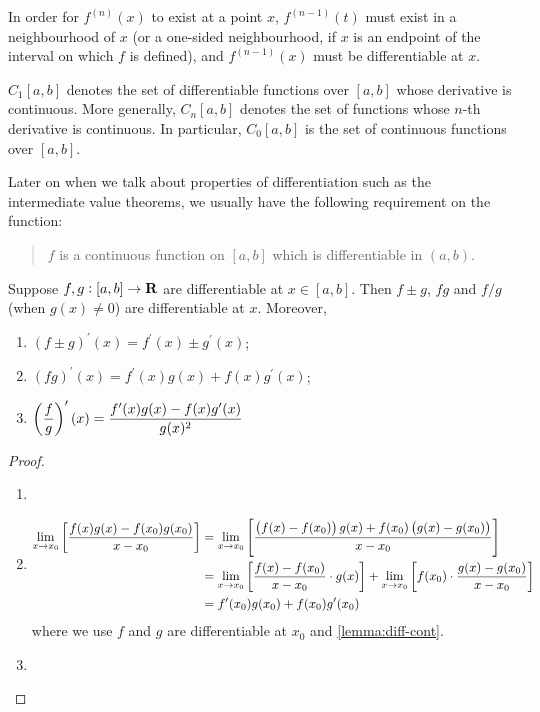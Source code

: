 \begin{remark}
In order for $f^{(n)}(x)$ to exist at a point $x$, $f^{(n-1)}(t)$ must exist in a neighbourhood of $x$ (or a one-sided neighbourhood, if $x$ is an endpoint of the interval on which $f$ is defined), and $f^{(n-1)}(x)$ must be differentiable at $x$.
\end{remark}

\begin{notation}
$C_1[a,b]$ denotes the set of differentiable functions over $[a,b]$ whose derivative is continuous. More generally, $C_n[a,b]$ denotes the set of functions whose $n$-th derivative is continuous. In particular, $C_0[a,b]$ is the set of continuous functions over $[a,b]$.
\end{notation}

Later on when we talk about properties of differentiation such as the intermediate value theorems, we usually have the following requirement on the function:
\begin{quote}
$f$ is a continuous function on $[a,b]$ which is differentiable in $(a,b)$.
\end{quote}

\begin{lemma}
Suppose $f,g:[a,b]\to\mathbf R$ are differentiable at $x\in[a,b]$. Then $f\pm g$, $fg$ and $f/g$ (when $g(x)\neq0$) are differentiable at $x$. Moreover,
\begin{enumerate}[label=(\arabic*)]
\item $(f\pm g)^\prime(x)=f^\prime(x)\pm g^\prime(x)$;
\item $(fg)^\prime(x)=f^\prime(x)g(x)+f(x)g^\prime(x)$;
\item $\displaystyle\left(\frac{f}{g}\right)^\prime(x)=\frac{f^\prime(x)g(x)-f(x)g^\prime(x)}{g(x)^2}$
\end{enumerate}
\end{lemma}

\begin{proof} \
\begin{enumerate}[label=(\arabic*)]
\item 
\item \begin{align*}
\lim_{x\to x_0}\left[\frac{f(x)g(x)-f(x_0)g(x_0)}{x-x_0}\right]
&=\lim_{x\to x_0}\left[\frac{\left(f(x)-f(x_0)\right)g(x)+f(x_0)\left(g(x)-g(x_0)\right)}{x-x_0}\right]\\
&=\lim_{x\to x_0}\left[\frac{f(x)-f(x_0)}{x-x_0}\cdot g(x)\right]+\lim_{x\to x_0}\left[f(x_0)\cdot\frac{g(x)-g(x_0)}{x-x_0}\right]\\
&=f^\prime(x_0)g(x_0)+f(x_0)g^\prime(x_0)
\end{align*}
where we use $f$ and $g$ are differentiable at $x_0$ and \cref{lemma:diff-cont}.

\item 
\end{enumerate}
\end{proof}

